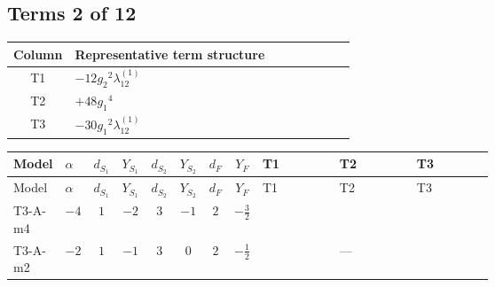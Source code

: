 \documentclass[8pt]{article}
\begin{document}
\begin{landscape}
\subsection*{Terms 2 of 12}
\begin{center}
\begin{tabular}{@{}c >{\raggedright\arraybackslash}p{0.82\linewidth}@{}}
\toprule
Column & Representative term structure \\
\midrule
T1 & \(\displaystyle -12 {g_2}^2 {\lambda_{12}^{(1)}}\) \\
\midrule
T2 & \(\displaystyle +48 {g_1}^4\) \\
\midrule
T3 & \(\displaystyle -30 {g_1}^2 {\lambda_{12}^{(1)}}\) \\
\midrule
\bottomrule
\end{tabular}
\end{center}
\smallskip
\tiny
\begin{longtable}{@{}llcccccc >{\raggedright\arraybackslash}p{0.21\linewidth} >{\raggedright\arraybackslash}p{0.21\linewidth} >{\raggedright\arraybackslash}p{0.21\linewidth}@{}}
\toprule
Model & $\alpha$ & $d_{S_1}$ & $Y_{S_1}$ & $d_{S_2}$ & $Y_{S_2}$ & $d_F$ & $Y_F$ & T1 & T2 & T3 \\
\midrule
\endfirsthead
\toprule
Model & $\alpha$ & $d_{S_1}$ & $Y_{S_1}$ & $d_{S_2}$ & $Y_{S_2}$ & $d_F$ & $Y_F$ & T1 & T2 & T3 \\
\midrule
\endhead
T3-A-m4 & $-4$ & $1$ & $-2$ & $3$ & $-1$ & $2$ & $-\frac{3}{2}$ & \scriptsize\adjustbox{max width=\linewidth}{$\begin{gathered} -12 {g_2}^2 {\lambda_{12}^{(1)}}\end{gathered}$} & \scriptsize\adjustbox{max width=\linewidth}{$\begin{gathered} +48 {g_1}^4\end{gathered}$} & \scriptsize\adjustbox{max width=\linewidth}{$\begin{gathered} -30 {g_1}^2 {\lambda_{12}^{(1)}}\end{gathered}$} \\
\midrule
T3-A-m2 & $-2$ & $1$ & $-1$ & $3$ & $0$ & $2$ & $-\frac{1}{2}$ & \scriptsize\adjustbox{max width=\linewidth}{$\begin{gathered} -12 {g_2}^2 {\lambda_{12}^{(1)}}\end{gathered}$} & --- & \scriptsize\adjustbox{max width=\linewidth}{$\begin{gathered} -6 {g_1}^2 {\lambda_{12}^{(1)}}\end{gathered}$} \\

\end{longtable}
\end{landscape}
\end{document}
